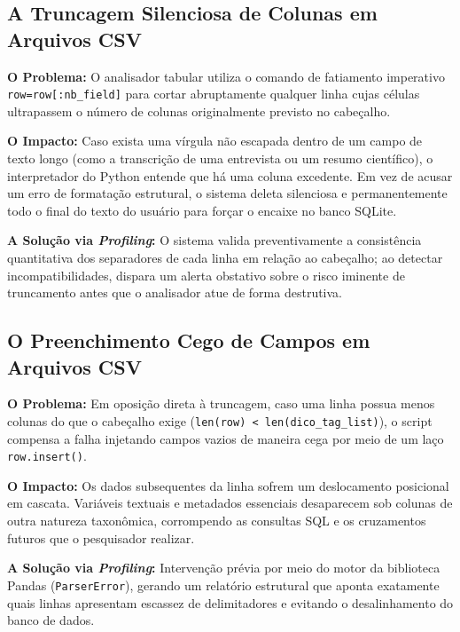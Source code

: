 \documentclass[
	oneside,
	a4paper,
	12pt,
	chapter=TITLE,
	section=TITLE,
	english,
	brazilian
]{abntex2}
\begin{document}
\begin{apendicesenv}
\FloatBarrier
\subsection{A Truncagem Silenciosa de Colunas em Arquivos CSV}\label{sec:a_truncagem_silenciosa_de_colunas_em_arq}


\textbf{O Problema:} O analisador tabular utiliza o comando de fatiamento imperativo \texttt{row=row[:nb\_\allowbreak field]} para cortar abruptamente qualquer linha cujas células ultrapassem o número de colunas originalmente previsto no cabeçalho.

\textbf{O Impacto:} Caso exista uma vírgula não escapada dentro de um campo de texto longo (como a transcrição de uma entrevista ou um resumo científico), o interpretador do Python entende que há uma coluna excedente. Em vez de acusar um erro de formatação estrutural, o sistema deleta silenciosa e permanentemente todo o final do texto do usuário para forçar o encaixe no banco SQLite.

\textbf{A Solução via \textit{Profiling}:} O sistema valida preventivamente a consistência quantitativa dos separadores de cada linha em relação ao cabeçalho; ao detectar incompatibilidades, dispara um alerta obstativo sobre o risco iminente de truncamento antes que o analisador atue de forma destrutiva.

\FloatBarrier
\subsection{O Preenchimento Cego de Campos em Arquivos CSV}\label{sec:o_preenchimento_cego_de_campos_em_arquiv}


\textbf{O Problema:} Em oposição direta à truncagem, caso uma linha possua menos colunas do que o cabeçalho exige (\texttt{len(row) < len(dico\_\allowbreak tag\_\allowbreak list)}), o script compensa a falha injetando campos vazios de maneira cega por meio de um laço \texttt{row.\allowbreak insert()}.

\textbf{O Impacto:} Os dados subsequentes da linha sofrem um deslocamento posicional em cascata. Variáveis textuais e metadados essenciais desaparecem sob colunas de outra natureza taxonômica, corrompendo as consultas SQL e os cruzamentos futuros que o pesquisador realizar.

\textbf{A Solução via \textit{Profiling}:} Intervenção prévia por meio do motor da biblioteca Pandas (\texttt{ParserError}), gerando um relatório estrutural que aponta exatamente quais linhas apresentam escassez de delimitadores e evitando o desalinhamento do banco de dados.


\end{apendicesenv}
\end{document}
